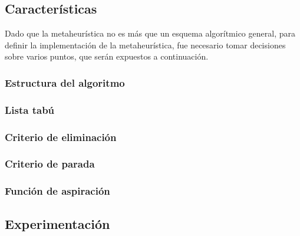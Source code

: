\subsection{Características}
Dado que la metaheurística no es más que un esquema algorítmico general, para
definir la implementación de la metaheurística, fue necesario tomar decisiones
sobre varios puntos, que serán expuestos a continuación.

\subsubsection{Estructura del algoritmo}

\subsubsection{Lista tabú}

\subsubsection{Criterio de eliminación}

\subsubsection{Criterio de parada}

\subsubsection{Función de aspiración}

\subsection{Experimentación}
